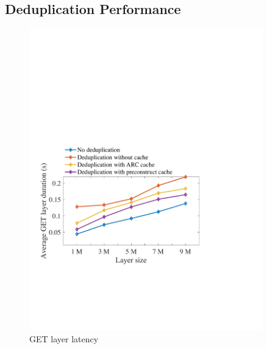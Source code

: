 

\subsection{Deduplication Performance}
\label{sec:eval-dedup}


\begin{figure}[t]
	\centering
	\begin{minipage}{0.3\textwidth}
		\centering
		\includegraphics[width=0.9\textwidth]{graphs/1nodegetlayerlatency.pdf}
		\caption{GET layer latency
		}%
		\label{fig:eval-1nodegetlayerlatency}
	\end{minipage}%
	\begin{minipage}{0.3\textwidth}
		\centering

\end{minipage}
\end{figure}
